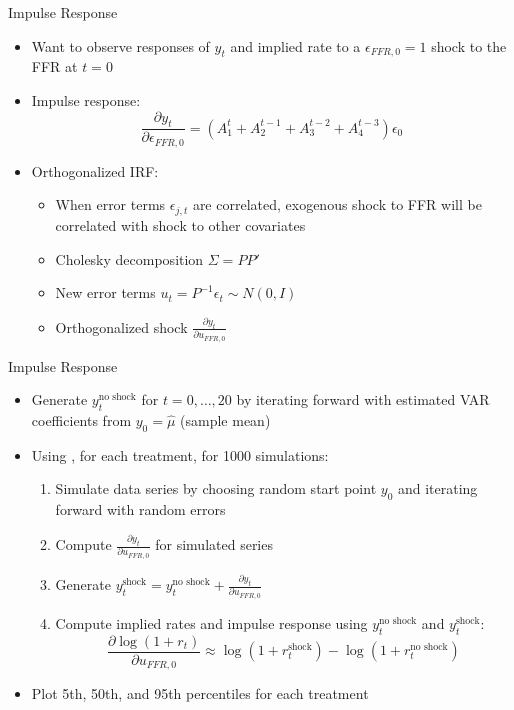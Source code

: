 \documentclass{beamer}
\begin{document}
\begin{frame}{Impulse Response}
\begin{itemize}
\item Want to observe responses of $y_t$ and implied rate to a $\epsilon_{FFR,0} = 1$ shock to the FFR at $t = 0$
\item Impulse response: $$\frac{\partial y_t}{\partial \epsilon_{FFR,0}} = (A_1^t + A_2^{t-1} + A_3^{t-2} + A_4^{t-3}) \epsilon_0$$
\item Orthogonalized IRF:
  \begin{itemize}
  \item When error terms $\epsilon_{j,t}$ are correlated, exogenous shock to FFR will be correlated with shock to other covariates
  \item Cholesky decomposition $\Sigma = PP'$
  \item New error terms $u_t = P^{-1} \epsilon_t \sim N(0, I)$
  \item Orthogonalized shock $\frac{\partial y_t}{\partial u_{FFR,0}}$
  \end{itemize}
\end{itemize}
\end{frame}

\begin{frame}{Impulse Response}
\begin{itemize}
\item Generate $y_t^\text{no shock}$ for $t = 0, \ldots, 20$ by iterating forward with estimated VAR coefficients from $y_0 = \hat{\mu}$ (sample mean)
\item Using \cite{kilian98}, for each treatment, for 1000 simulations:
  \begin{enumerate}
  \item Simulate data series by choosing random start point $y_0$ and iterating forward with random errors
  \item Compute $\frac{\partial y_t}{\partial u_{FFR,0}}$ for simulated series
  \item Generate $y_t^\text{shock} = y_t^\text{no shock} + \frac{\partial y_t}{\partial u_{FFR,0}}$
  \item Compute implied rates and impulse response using $y_t^\text{no shock}$ and $y_t^\text{shock}$: $$\frac{\partial \log(1+r_t)}{\partial u_{FFR,0}} \approx \log(1 + r_t^\text{shock}) - \log(1 + r_t^\text{no shock})$$
  \end{enumerate}
\item Plot 5th, 50th, and 95th percentiles for each treatment
\end{itemize}
\end{frame}
\end{document}
